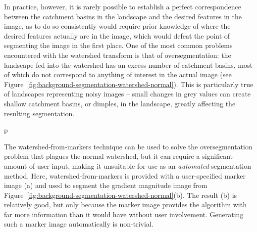 In practice, however, it is rarely possible to establish a perfect correspondence between the catchment basins in the landscape and the desired features in the image, as to do so consistently would require prior knowledge of where the desired features actually are in the image, which would defeat the point of segmenting the image in the first place. One of the most common problems encountered with the watershed transform is that of oversegmentation: the landscape fed into the watershed has an excess number of catchment basins, most of which do not correspond to anything of interest in the actual image (see Figure~\ref{fig:background-segmentation-watershed-normal}). This is particularly true of landscapes representing noisy images -- small changes in grey values can create shallow catchment basins, or dimples, in the landscape, greatly affecting the resulting segmentation.

\begin{stusubfig}{p}
	\hspace{4mm}%
\caption[An example of the watershed-from-markers technique]{The watershed-from-markers technique can be used to solve the oversegmentation problem that plagues the normal watershed, but it can require a significant amount of user input, making it unsuitable for use as an \emph{automated} segmentation method. Here, watershed-from-markers is provided with a user-specified marker image (a) and used to segment the gradient magnitude image from Figure~\ref{fig:background-segmentation-watershed-normal}(b). The result (b) is relatively good, but only because the marker image provides the algorithm with far more information than it would have without user involvement. Generating such a marker image automatically is non-trivial.}
\label{fig:background-segmentation-watershed-markers}
\end{stusubfig}


